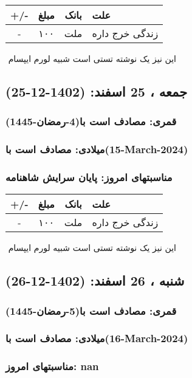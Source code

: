 \documentclass{article}
\newcommand{\rnote}[1]{\marginpar{\textcolor{color}{\StrSubstitute{\##1}{ }{\_}}}}
\newcommand{\myRow}[4]{
    #1 & #2 & #3 & #4 \\ \hline
}
\begin{document}
\begin{tabular}{ | c | c | c | p{5cm} |}
    \hline
    \myRow{ +/- }{مبلغ}{بانک}{علت}
    \myRow{-}{۱۰۰}{ملت}{زندگی خرج داره}
\end{tabular}
\newline
\newline

‌
\rnote{تست}
این نیز یک نوشته تستی است شبیه لورم ایپسام




\newpage
{}
\textcolor{color}{
\section{ جمعه ، 25 اسفند: (1402-12-25) }
\subsubsection*{قمری: مصادف است با(4-رمضان-1445)} 
\subsubsection*{میلادی: مصادف است با(15-March-2024)}
\subsubsection*{مناسبتهای امروز: پایان سرایش شاهنامه}
}


\begin{tabular}{ | c | c | c | p{5cm} |}
    \hline
    \myRow{ +/- }{مبلغ}{بانک}{علت}
    \myRow{-}{۱۰۰}{ملت}{زندگی خرج داره}
\end{tabular}
\newline
\newline

‌
\rnote{تست}
این نیز یک نوشته تستی است شبیه لورم ایپسام




\newpage
{}
\textcolor{color}{
\section{ شنبه ، 26 اسفند: (1402-12-26) }
\subsubsection*{قمری: مصادف است با(5-رمضان-1445)} 
\subsubsection*{میلادی: مصادف است با(16-March-2024)}
\subsubsection*{مناسبتهای امروز: nan}
}
\end{document}
